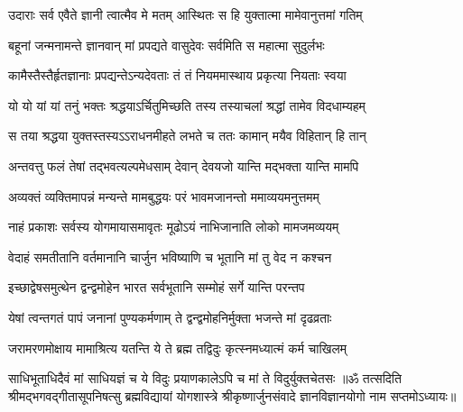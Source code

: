 \twolineshloka
{उदाराः सर्व एवैते ज्ञानी त्वात्मैव मे मतम्}
{आस्थितः स हि युक्तात्मा मामेवानुत्तमां गतिम्}%

\twolineshloka
{बहूनां जन्मनामन्ते ज्ञानवान् मां प्रपद्यते}
{वासुदेवः सर्वमिति स महात्मा सुदुर्लभः}%

\twolineshloka
{कामैस्तैस्तैर्हृतज्ञानाः प्रपद्यन्तेऽन्यदेवताः}
{तं तं नियममास्थाय प्रकृत्या नियताः स्वया}%

\twolineshloka
{यो यो यां यां तनुं भक्तः श्रद्धयाऽर्चितुमिच्छति}
{तस्य तस्याचलां श्रद्धां तामेव विदधाम्यहम्}%

\twolineshloka
{स तया श्रद्धया युक्तस्तस्यऽऽराधनमीहते}
{लभते च ततः कामान् मयैव विहितान् हि तान्}%

\twolineshloka
{अन्तवत्तु फलं तेषां तद्भवत्यल्पमेधसाम्}
{देवान् देवयजो यान्ति मद्भक्ता यान्ति मामपि}%

\twolineshloka
{अव्यक्तं व्यक्तिमापन्नं मन्यन्ते मामबुद्धयः}
{परं भावमजानन्तो ममाव्ययमनुत्तमम्}%

\twolineshloka
{नाहं प्रकाशः सर्वस्य योगमायासमावृतः}
{मूढोऽयं नाभिजानाति लोको मामजमव्ययम्}%

\twolineshloka
{वेदाहं समतीतानि वर्तमानानि चार्जुन}
{भविष्याणि च भूतानि मां तु वेद न कश्चन}%

\twolineshloka
{इच्छाद्वेषसमुत्थेन द्वन्द्वमोहेन भारत}
{सर्वभूतानि सम्मोहं सर्गे यान्ति परन्तप}%

\twolineshloka
{येषां त्वन्तगतं पापं जनानां पुण्यकर्मणाम्}
{ते द्वन्द्वमोहनिर्मुक्ता भजन्ते मां दृढव्रताः}%

\twolineshloka
{जरामरणमोक्षाय मामाश्रित्य यतन्ति ये}
{ते ब्रह्म तद्विदुः कृत्स्नमध्यात्मं कर्म चाखिलम्}%

\twolineshloka
{साधिभूताधिदैवं मां साधियज्ञं च ये विदुः}
{प्रयाणकालेऽपि च मां ते विदुर्युक्तचेतसः}%
{॥ॐ तत्सदिति श्रीमद्भगवद्गीतासूपनिषत्सु ब्रह्मविद्यायां योगशास्त्रे श्रीकृष्णार्जुनसंवादे ज्ञानविज्ञानयोगो नाम सप्तमोऽध्यायः॥}